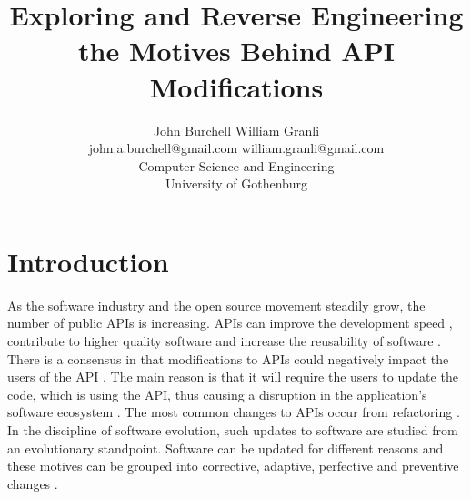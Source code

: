 \documentclass[10pt,twocolumn]{article}
\title{Exploring and Reverse Engineering the Motives Behind API Modifications}
\begin{document}


\author{John Burchell \qquad William Granli \\
		john.a.burchell@gmail.com \qquad william.granli@gmail.com \\
		Computer Science and Engineering  \\
		University of Gothenburg }


\maketitle





\section{Introduction}
As the software industry and the open source movement steadily grow, the number of public APIs is increasing. APIs can improve the development speed \cite{stylos2006comparing}, contribute to higher quality software \cite{stylos2006comparing} and increase the reusability of software \cite{afonso2012evaluating}. There is a consensus in that modifications to APIs could negatively impact the users of the API \cite{google_talk} \cite{mcdonnell2013empirical} \cite{robbes2012developers} \cite{henning2007api}. The main reason is that it will require the users to update the code, which is using the API, thus causing a disruption in the application's software ecosystem \cite{messerschmitt2005software}. The most common changes to APIs occur from refactoring \cite{dig2005role} \cite{xing2006refactoring}. 
In the discipline of software evolution, such updates to software are studied from an evolutionary standpoint. Software can be updated for different reasons and these motives can be grouped into corrective, adaptive, perfective and preventive changes \cite{lientz1980software}. 
\end{document}
